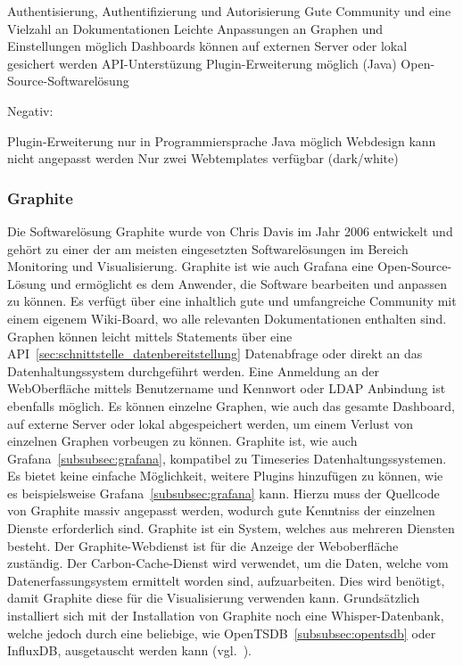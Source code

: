 \begin{outline}
  \1 Authentisierung, Authentifizierung und Autorisierung
  \1 Gute Community und eine Vielzahl an Dokumentationen
  \1 Leichte Anpassungen an Graphen und Einstellungen möglich
  \1 Dashboards können auf externen Server oder lokal gesichert werden
  \1 API\hyp{}Unterstüzung
  \1 Plugin\hyp{}Erweiterung möglich (Java)
  \1 Open\hyp{}Source\hyp{}Softwarelösung
\end{outline}

Negativ:

\begin{outline}
  \1 Plugin\hyp{}Erweiterung nur in Programmiersprache Java möglich
  \1 Webdesign kann nicht angepasst werden
  \1 Nur zwei Webtemplates verfügbar (dark/white)
\end{outline}
\mr%

\subsubsection{Graphite}
\label{subsubsec:graphite}
Die Softwarelösung Graphite wurde von Chris Davis im Jahr 2006 entwickelt und
gehört zu einer der am meisten eingesetzten Softwarelösungen im Bereich
Monitoring und Visualisierung. Graphite ist wie auch Grafana eine
Open\hyp{}Source\hyp{}Lösung und ermöglicht es dem Anwender, die Software
bearbeiten und anpassen zu können. Es verfügt über eine inhaltlich gute und
umfangreiche Community mit einem eigenem Wiki\hyp{}Board, wo alle relevanten
Dokumentationen enthalten sind. Graphen können leicht mittels Statements über
eine API~\ref{sec:schnittstelle_datenbereitstellung} Datenabfrage oder direkt
an das Datenhaltungssystem durchgeführt werden. Eine Anmeldung an der
WebOberfläche mittels Benutzername und Kennwort oder \gls{LDAP} Anbindung ist
ebenfalls möglich. Es können einzelne Graphen, wie auch das gesamte Dashboard,
auf externe Server oder lokal abgespeichert werden, um einem Verlust von
einzelnen Graphen vorbeugen zu können. Graphite ist, wie auch
Grafana~\ref{subsubsec:grafana}, kompatibel zu Timeseries
Datenhaltungssystemen. Es bietet keine einfache Möglichkeit, weitere Plugins
hinzufügen zu können, wie es beispielsweise Grafana~\ref{subsubsec:grafana}
kann. Hierzu muss der Quellcode von Graphite massiv angepasst werden, wodurch
gute Kenntniss der einzelnen Dienste erforderlich sind. Graphite ist ein
System, welches aus mehreren Diensten besteht. Der Graphite\hyp{}Webdienst ist
für die Anzeige der Weboberfläche zuständig. Der Carbon\hyp{}Cache\hyp{}Dienst
wird verwendet, um die Daten, welche vom Datenerfassungsystem ermittelt worden
sind, aufzuarbeiten. Dies wird benötigt, damit Graphite diese für die
Visualisierung verwenden kann. Grundsätzlich installiert sich mit der
Installation von Graphite noch eine Whisper\hyp{}Datenbank, welche jedoch durch
eine beliebige, wie OpenTSDB~\ref{subsubsec:opentsdb} oder InfluxDB,
ausgetauscht werden kann (vgl.~\cite{graphite}).

